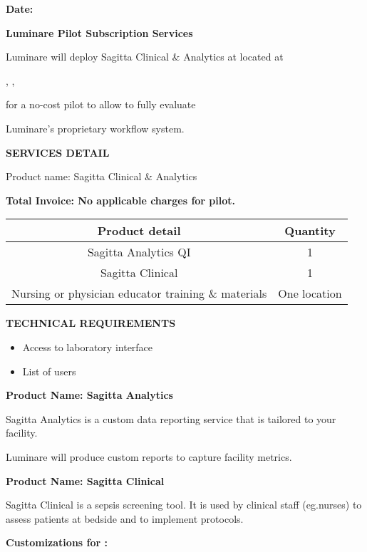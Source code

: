 \documentclass[11pt,a4paper]{article} %
\providecommand{\tightlist}{%
  \setlength{\itemsep}{0pt}\setlength{\parskip}{0pt}}
\begin{document}
\textbf{Date: }


\textbf{Luminare Pilot Subscription Services} 


Luminare will deploy Sagitta Clinical \& Analytics at 
located at



, , 

for a  no-cost pilot to allow  to fully
evaluate

Luminare's proprietary workflow system.

\textbf{SERVICES DETAIL}

Product name: Sagitta Clinical \& Analytics ~

\textbf{Total Invoice: No applicable charges for  pilot.}

\begin{center}
\begin{tabular}{|c c|} 
 \hline
 Product detail & Quantity \\ [0.5ex] 
 \hline
 Sagitta Analytics QI & 1  \\ 
 \hline
 Sagitta Clinical & 1  \\
 \hline
 Nursing or physician educator training \& materials & One location  \\
 \hline
\end{tabular}   
\end{center}

\textbf{TECHNICAL REQUIREMENTS}

\begin{itemize}
\tightlist
\item
  Access to laboratory interface
\item
  List of users
\end{itemize}

\textbf{Product Name: Sagitta Analytics} ~

Sagitta Analytics is a custom data reporting service that is tailored to
your facility.

Luminare will produce custom reports to capture facility metrics.

\textbf{Product Name: Sagitta Clinical}

Sagitta Clinical is a sepsis screening tool. It is used by clinical
staff (eg.nurses) to assess patients at bedside and to implement
protocols.

\textbf{Customizations for :}
\end{document}
